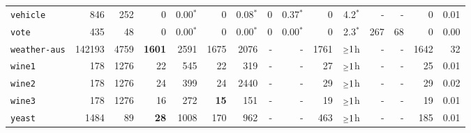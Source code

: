 \begin{tabular}{lccrrrrrrrrrrrr}
\texttt{vehicle} & \multicolumn{1}{r}{846} & \multicolumn{1}{r}{252}  & 0 & 0.00$^*$ & 0 & 0.08$^*$ & 0 & 0.37$^*$ & 0 & 4.2$^*$ & - & - & 0 & 0.01\\
\texttt{vote} & \multicolumn{1}{r}{435} & \multicolumn{1}{r}{48}  & 0 & 0.00$^*$ & 0 & 0.00$^*$ & 0 & 0.00$^*$ & 0 & 2.3$^*$ & 267 & 68 & 0 & 0.00\\
\texttt{weather-aus} & \multicolumn{1}{r}{142193} & \multicolumn{1}{r}{4759}  & \textbf{1601} & 2591 & 1675 & 2076 & - & - & 1761 & $\mathsmaller{\geq}1$h & - & - & 1642 & 32\\
\texttt{wine1} & \multicolumn{1}{r}{178} & \multicolumn{1}{r}{1276}  & 22 & 545 & 22 & 319 & - & - & 27 & $\mathsmaller{\geq}1$h & - & - & 25 & 0.01\\
\texttt{wine2} & \multicolumn{1}{r}{178} & \multicolumn{1}{r}{1276}  & 24 & 399 & 24 & 2440 & - & - & 29 & $\mathsmaller{\geq}1$h & - & - & 29 & 0.02\\
\texttt{wine3} & \multicolumn{1}{r}{178} & \multicolumn{1}{r}{1276}  & 16 & 272 & \textbf{15} & 151 & - & - & 19 & $\mathsmaller{\geq}1$h & - & - & 19 & 0.01\\
\texttt{yeast} & \multicolumn{1}{r}{1484} & \multicolumn{1}{r}{89}  & \textbf{28} & 1008 & 170 & 962 & - & - & 463 & $\mathsmaller{\geq}1$h & - & - & 185 & 0.01\\
\bottomrule
\end{tabular}
